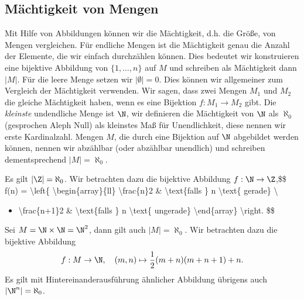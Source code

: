 \documentclass[letterpaper,10pt,english]{jupyterBook}
\begin{document}
\subsection{Mächtigkeit von Mengen}
\label{\detokenize{grundlagen/mengenlogik:machtigkeit-von-mengen}}
Mit Hilfe von Abbildungen können wir die Mächtigkeit, d.h. die Größe, von Mengen vergleichen. Für endliche Mengen ist die Mächtigkeit genau die Anzahl der Elemente, die wir einfach durchzählen können. Dies bedeutet wir konstruieren eine bijektive Abbildung von \(\{1,\ldots,n\}\) auf \(M\) und schreiben als Mächtigkeit dann \(\vert M \vert\). Für die leere Menge setzen wir \(\vert \emptyset \vert =0\). Dies können wir allgemeiner zum Vergleich der Mächtigkeit verwenden. Wir sagen, dass zwei Mengen \(M_1\) und \(M_2\) die gleiche Mächtigkeit haben, wenn es eine Bijektion \(f: M_1 \rightarrow M_2\) gibt.
Die \emph{kleinste} undendliche Menge ist \(\N\), wir definieren die Mächtigkeit von \(\N\) als \(\aleph_0\) (gesprochen Aleph Null) als kleinstes Maß für Unendlichkeit, diese nennen wir erste Kardinalzahl. Mengen \(M\), die durch eine Bijektion auf \(\N\) abgebildet werden können, nennen wir abzählbar (oder abzählbar unendlich) und schreiben dementsprechend \(|M|=\aleph_0\).
\label{grundlagen/mengenlogik:example-12}
\begin{example}{}{}



Es gilt \(|\Z|=\aleph_0\). Wir betrachten dazu die bijektive Abbildung \(f: \N \rightarrow \Z\),\$\$ f(n) = \textbackslash{}left\{ \textbackslash{}begin\{array\}\{ll\} \textbackslash{}frac\{n\}2 \& \textbackslash{}text\{falls \} n \textbackslash{}text\{ gerade\} \textbackslash{}
\begin{itemize}
\item {} 
\textbackslash{}frac\{n+1\}2 \& \textbackslash{}text\{falls \} n \textbackslash{}text\{ ungerade\} \textbackslash{}end\{array\} \textbackslash{}right. \$\$

\end{itemize}
\end{example}
\label{grundlagen/mengenlogik:example-13}
\begin{example}{}{}



Sei \(M= \N \times \N = \N^2\), dann gilt auch \(|M|=\aleph_0\). Wir betrachten dazu die bijektive Abbildung
\begin{equation*}
f: M \rightarrow \N, \quad (m,n) \mapsto \frac{1}2(m+n)(m+n+1) + n.
\end{equation*}
Es gilt mit Hintereinanderausführung ähnlicher Abbildung übrigens auch \(|\N^n|=\aleph_0\).
\end{example}
\end{document}
